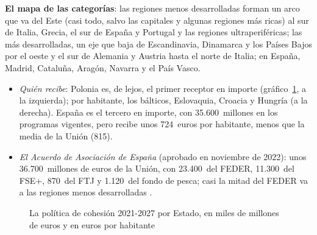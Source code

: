 \documentclass[11pt]{article}
\begin{document}
\begin{anotaciones}
\textbf{El mapa de las categorías}: las regiones menos desarrolladas forman un arco que va del Este (casi todo, salvo las capitales y algunas regiones más ricas) al sur de Italia, Grecia, el sur de España y Portugal y las regiones ultraperiféricas; las más desarrolladas, un eje que baja de Escandinavia, Dinamarca y los Países Bajos por el oeste y el sur de Alemania y Austria hasta el norte de Italia; en España, Madrid, Cataluña, Aragón, Navarra y el País Vasco.
\begin{figuracaja}
\caption{Las categorías de regiones de la política de cohesión 2021-2027}\label{fig:mapa-categorias}
\end{figuracaja}
\end{anotaciones}

\begin{itemize}
\item \emph{Quién recibe}: Polonia es, de lejos, el primer receptor en importe (gráfico~\ref{fig:cohesion-estados}, a la izquierda); por habitante, los bálticos, Eslovaquia, Croacia y Hungría (a la derecha). España es el tercero en importe, con 35.600~millones en los programas vigentes, pero recibe unos 724~euros por habitante, menos que la media de la Unión (815)\nocite{CE2026Cohesiondata}.
\item \emph{El Acuerdo de Asociación de España} (aprobado en noviembre de 2022): unos 36.700~millones de euros de la Unión, con 23.400~del FEDER, 11.300~del FSE+, 870~del FTJ y 1.120~del fondo de pesca; casi la mitad del FEDER va a las regiones menos desarrolladas\nocite{CE2026Cohesiondata,Hacienda2026FondosEuropeos}  .
\end{itemize}

\begin{figure}[H]
\centering
\caption{La política de cohesión 2021-2027 por Estado, en miles de millones de euros y en euros por habitante}\label{fig:cohesion-estados}
\end{figure}
\end{document}

